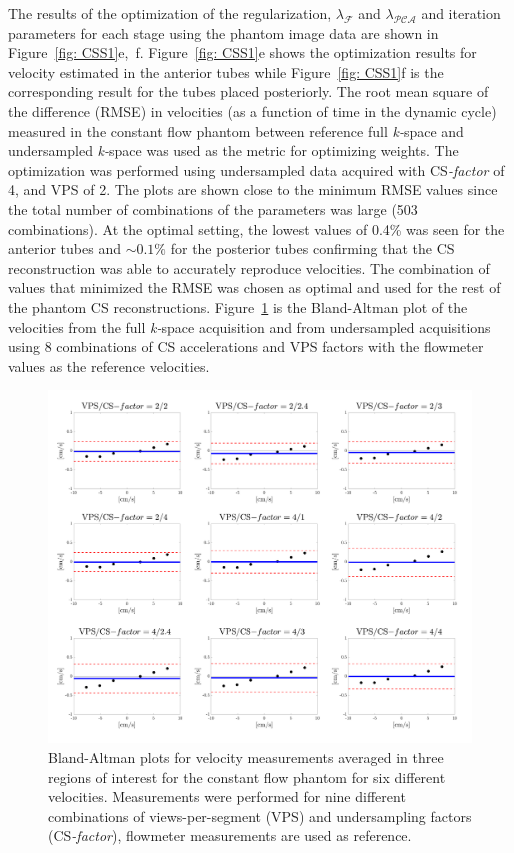 The results of the optimization of the regularization, $\lambda_{\mathcal{F}}$ and $\lambda_{\mathcal{PCA}}$ and iteration parameters for each stage using the phantom image data are shown in Figure~\ref{fig: CSS1}e,~f. 
Figure~\ref{fig: CSS1}e shows the optimization results for velocity estimated in the anterior tubes while Figure~\ref{fig: CSS1}f is the corresponding result for the tubes placed posteriorly. 
The root mean square of the difference (RMSE) in velocities (as a function of time in the dynamic cycle) measured in the constant flow phantom between reference full \mbox{\textit{k-}space} and undersampled \mbox{\textit{k-}space} was used as the metric for optimizing weights. 
The optimization was performed using undersampled data acquired with \mbox{CS\textit{-factor}} of 4, and VPS of 2. 
The plots are shown close to the minimum RMSE values since the total number of combinations of the parameters was large (503 combinations). 
At the optimal setting, the lowest values of 0.4\% was seen for the anterior tubes and $\sim 0.1\%$ for the posterior tubes confirming that the CS reconstruction was able to accurately reproduce velocities. 
The combination of values that minimized the RMSE was chosen as optimal and used for the rest of the phantom CS reconstructions. 
Figure~\ref{fig: CSS5} is the Bland-Altman plot of the velocities from the full \mbox{\textit{k-}space} acquisition and from undersampled acquisitions using 8 combinations of CS accelerations and VPS factors with the flowmeter values as the reference velocities. 
\begin{figure}[!htb]
\vspace{+0.2cm}
\centering
\includegraphics[width=\textwidth]{Figures/CS1_8.pdf}
\caption[Bland-Altman plots for velocity measurements for the constant flow phantom]{Bland-Altman plots for velocity measurements averaged in three regions of interest for the constant flow phantom for six different velocities. Measurements were performed for nine different combinations of views-per-segment (VPS) and undersampling factors (\mbox{CS\textit{-factor}}), flowmeter measurements are used as reference.}
\label{fig: CSS5}
\end{figure}
